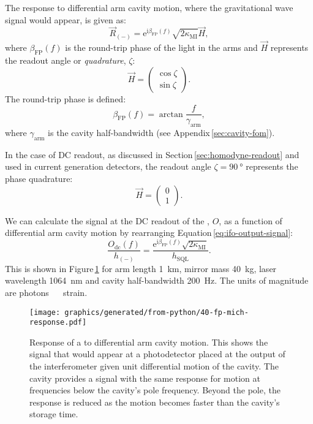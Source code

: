 The response to differential arm cavity motion, where the gravitational wave signal would appear, is given as:
\begin{equation}
  \label{eq:fp-mich-response}
  \vec{R}_{\left( - \right)} = \text{e}^{\text{i} \beta_{\text{FP}} \left( f \right)} \sqrt{2 \kappa_{\text{MI}}} \vec{H},
\end{equation}
where $\beta_{\text{FP}} \left( f \right)$ is the round-trip phase of the light in the arms and $\vec{H}$ represents the readout angle or \emph{quadrature}, $\zeta$:
\begin{equation}
  \vec{H} =
  \begin{pmatrix}
    \cos \zeta \\
    \sin \zeta
  \end{pmatrix}.
\end{equation}
The round-trip phase is defined:
\begin{equation}
  \beta_{\text{FP}} \left( f \right) = \arctan{\frac{f}{\gamma_{\text{arm}}}},
\end{equation}
where $\gamma_{\text{arm}}$ is the \FP{} cavity half-bandwidth (see Appendix\,\ref{sec:cavity-fom}).

In the case of \gls{DC} readout, as discussed in Section\,\ref{sec:homodyne-readout} and used in current generation detectors, the readout angle $\zeta = \SI{90}{\degree}$ represents the phase quadrature:
\begin{equation}
  \vec{H} =
  \begin{pmatrix}
    0 \\
    1
  \end{pmatrix}.
\end{equation}

We can calculate the signal at the \gls{DC} readout of the \FPMI{}, $O$, as a function of differential arm cavity motion by rearranging Equation\,\ref{eq:ifo-output-signal}:
\begin{equation}
  \frac{O_{\text{dc}} \left( f \right)}{h_{\left( - \right)}} = \frac{\text{e}^{\text{i} \beta_{\text{FP}} \left( f \right)} \sqrt{2 \kappa_{\text{MI}}}}{h_{\text{SQL}}}.
\end{equation}
This is shown in Figure\,\ref{fig:fp-mich-response} for arm length \SI{1}{\kilo\meter}, mirror mass \SI{40}{\kilo\gram}, laser wavelength \SI{1064}{\nano\meter} and cavity half-bandwidth \SI{200}{\hertz}. The units of magnitude are photons \SI{}{\per\sqrthz} strain.

\begin{figure}
  \centering
  \texttt{[image: graphics/generated/from-python/40-fp-mich-response.pdf]}
  \caption[Response of a \FPMI{} to differential arm cavity motion]{\label{fig:fp-mich-response}Response of a \FPMI{} to differential arm cavity motion. This shows the signal that would appear at a photodetector placed at the output of the interferometer given unit differential motion of the cavity. The cavity provides a signal with the same response for motion at frequencies below the cavity's pole frequency. Beyond the pole, the response is reduced as the motion becomes faster than the cavity's storage time.}
\end{figure}

